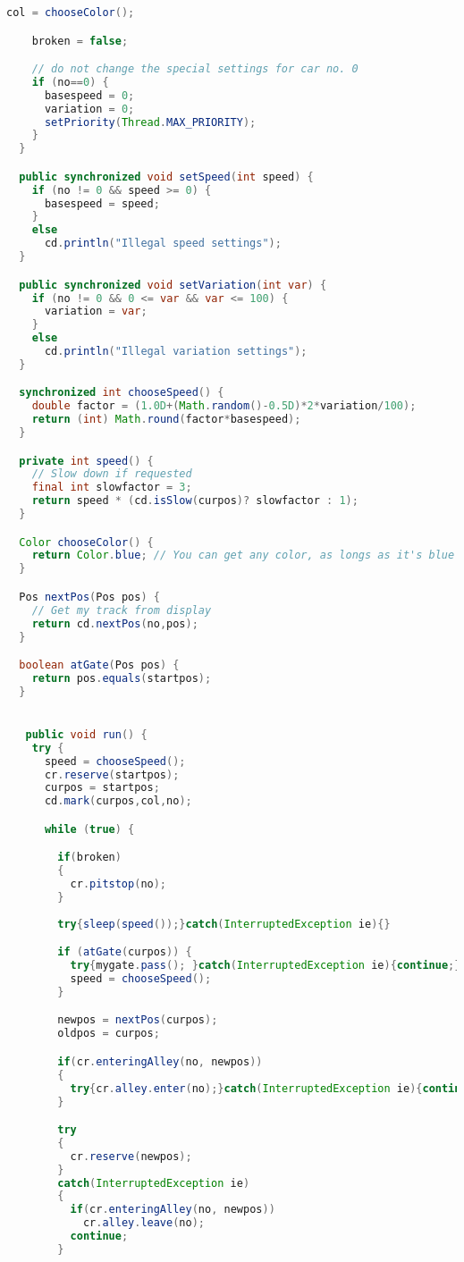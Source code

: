 \begin{lstlisting}[language=java]
    col = chooseColor();

    broken = false;

    // do not change the special settings for car no. 0
    if (no==0) {
      basespeed = 0;  
      variation = 0; 
      setPriority(Thread.MAX_PRIORITY); 
    }
  }

  public synchronized void setSpeed(int speed) { 
    if (no != 0 && speed >= 0) {
      basespeed = speed;
    }
    else
      cd.println("Illegal speed settings");
  }

  public synchronized void setVariation(int var) { 
    if (no != 0 && 0 <= var && var <= 100) {
      variation = var;
    }
    else
      cd.println("Illegal variation settings");
  }

  synchronized int chooseSpeed() { 
    double factor = (1.0D+(Math.random()-0.5D)*2*variation/100);
    return (int) Math.round(factor*basespeed);
  }

  private int speed() {
    // Slow down if requested
    final int slowfactor = 3;  
    return speed * (cd.isSlow(curpos)? slowfactor : 1);
  }

  Color chooseColor() { 
    return Color.blue; // You can get any color, as longs as it's blue 
  }

  Pos nextPos(Pos pos) {
    // Get my track from display
    return cd.nextPos(no,pos);
  }

  boolean atGate(Pos pos) {
    return pos.equals(startpos);
  }


   public void run() {
    try {
      speed = chooseSpeed();
      cr.reserve(startpos);
      curpos = startpos;
      cd.mark(curpos,col,no);

      while (true) {

        if(broken)
        {
          cr.pitstop(no);
        }
        
        try{sleep(speed());}catch(InterruptedException ie){}

        if (atGate(curpos)) { 
          try{mygate.pass(); }catch(InterruptedException ie){continue;}
          speed = chooseSpeed();
        }

        newpos = nextPos(curpos);
        oldpos = curpos;

        if(cr.enteringAlley(no, newpos))
        {
          try{cr.alley.enter(no);}catch(InterruptedException ie){continue;}
        }

        try
        {
          cr.reserve(newpos);
        }
        catch(InterruptedException ie)
        { 
          if(cr.enteringAlley(no, newpos))
            cr.alley.leave(no);
          continue;
        }


\end{lstlisting}
